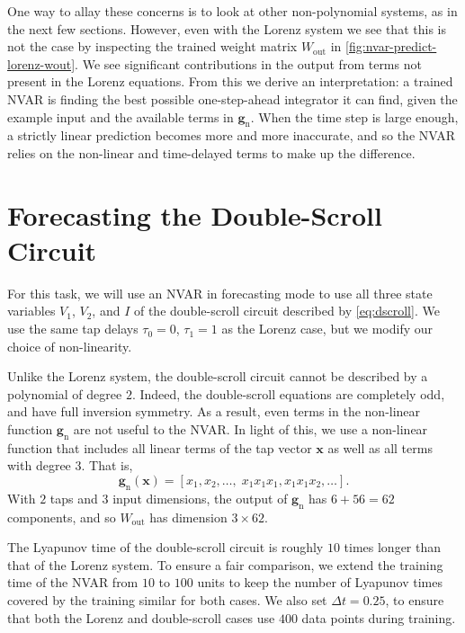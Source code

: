 One way to allay these concerns is to look at other non-polynomial
systems, as in the next few sections. However, even with the Lorenz
system we see that this is not the case by inspecting the trained
weight matrix $W_\text{out}$ in
\cref{fig:nvar-predict-lorenz-wout}. We see significant contributions
in the output from terms not present in the Lorenz equations. From
this we derive an interpretation: a trained NVAR is finding the best
possible one-step-ahead integrator it can find, given the example
input and the available terms in $\bm{g}_\text{n}$. When the time step
is large enough, a strictly linear prediction becomes more and more
inaccurate, and so the NVAR relies on the non-linear and time-delayed
terms to make up the difference.

\section{Forecasting the Double-Scroll Circuit}

For this task, we will use an NVAR in forecasting mode to use all
three state variables $V_1$, $V_2$, and $I$ of the double-scroll
circuit described by \cref{eq:dscroll}. We use the same tap
delays $\tau_0 = 0$, $\tau_1 = 1$ as the Lorenz case, but we modify
our choice of non-linearity.

Unlike the Lorenz system, the double-scroll circuit cannot be
described by a polynomial of degree $2$. Indeed, the double-scroll
equations are completely odd, and have full inversion
symmetry. As a result, even terms in the non-linear function
$\bm{g}_\text{n}$ are not useful to the NVAR. In light of this, we use
a non-linear function that includes all linear terms of the tap vector
$\bm{x}$ as well as all terms with degree $3$. That is,
\begin{equation}
  \bm{g}_\text{n}(\bm{x}) = [x_1, x_2, \dots, \; x_1 x_1 x_1, x_1 x_1 x_2, \dots].
\end{equation}
With $2$ taps and $3$ input dimensions, the output of
$\bm{g}_\text{n}$ has $6 + 56 = 62$ components, and so $W_\text{out}$
has dimension $3 \times 62$.

The Lyapunov time of the double-scroll circuit is roughly $10$ times
longer than that of the Lorenz system. To ensure a fair comparison, we
extend the training time of the NVAR from $10$ to $100$ units to keep
the number of Lyapunov times covered by the training similar for both
cases. We also set $\Delta t = 0.25$, to ensure that both the Lorenz
and double-scroll cases use $400$ data points during training.

